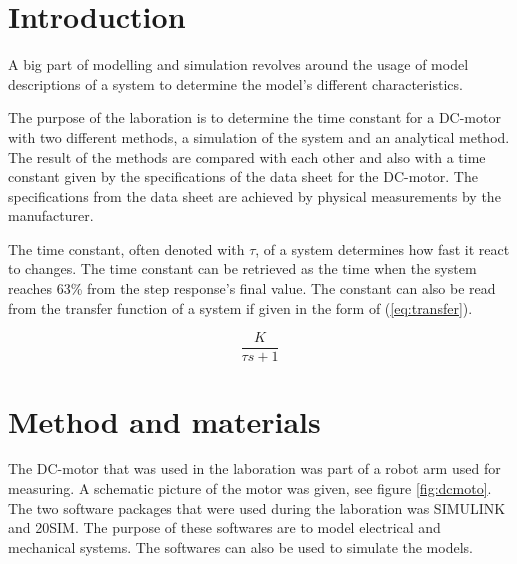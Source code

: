 \documentclass[12pt,a4paper]{article}
\begin{document}
\newpage

\tableofcontents

\newpage

\section{Introduction}
A big part of modelling and simulation revolves around the usage of model descriptions of a system to determine the model's different characteristics.

The purpose of the laboration is to determine the time constant for a DC-motor with two different methods, a simulation of the system and an analytical method. The result of the methods are compared with each other and also with a time constant given by the specifications of the data sheet for the DC-motor. The specifications from the data sheet are achieved by physical measurements by the manufacturer.

The time constant, often denoted with $\tau$, of a system determines how fast it react to changes. The time constant can be retrieved as the time when the system reaches 63\% from the step response's final value. The constant can also be read from the transfer function of a system if given in the form of (\ref{eq:transfer}).

\begin{equation}
\label{eq:transfer}
\frac{K}{\tau s+1}
\end{equation}

\section{Method and materials}
The DC-motor that was used in the laboration was part of a robot arm used for measuring. A schematic picture of the motor was given, see figure \ref{fig:dcmoto}.
The two software packages that were used during the laboration was SIMULINK and 20SIM. The purpose of these softwares are to model electrical and mechanical systems. The softwares can also be used to simulate the models.
\end{document}
